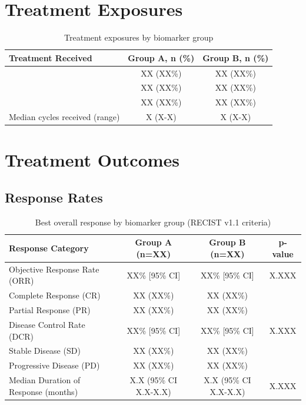 \documentclass[10pt,letterpaper]{article}
\begin{document}
\section{Treatment Exposures}

\begin{table}[H]
\centering
\small
\begin{tabular}{lcc}
\toprule
\textbf{Treatment Received} & \textbf{Group A, n (\%)} & \textbf{Group B, n (\%)} \\
\midrule
[Treatment regimen 1] & XX (XX\%) & XX (XX\%) \\
[Treatment regimen 2] & XX (XX\%) & XX (XX\%) \\
[Treatment regimen 3] & XX (XX\%) & XX (XX\%) \\
Median cycles received (range) & X (X-X) & X (X-X) \\
\bottomrule
\end{tabular}
\caption{Treatment exposures by biomarker group}
\end{table}

\section{Treatment Outcomes}

\subsection{Response Rates}

\begin{table}[H]
\centering
\small
\begin{tabular}{lccc}
\toprule
\textbf{Response Category} & \textbf{Group A (n=XX)} & \textbf{Group B (n=XX)} & \textbf{p-value} \\
\midrule
Objective Response Rate (ORR) & XX\% [95\% CI] & XX\% [95\% CI] & X.XXX \\
\quad Complete Response (CR) & XX (XX\%) & XX (XX\%) & \\
\quad Partial Response (PR) & XX (XX\%) & XX (XX\%) & \\
Disease Control Rate (DCR) & XX\% [95\% CI] & XX\% [95\% CI] & X.XXX \\
\quad Stable Disease (SD) & XX (XX\%) & XX (XX\%) & \\
Progressive Disease (PD) & XX (XX\%) & XX (XX\%) & \\
\midrule
Median Duration of Response (months) & X.X (95\% CI X.X-X.X) & X.X (95\% CI X.X-X.X) & X.XXX \\
\bottomrule
\end{tabular}
\caption{Best overall response by biomarker group (RECIST v1.1 criteria)}
\end{table}
\end{document}
